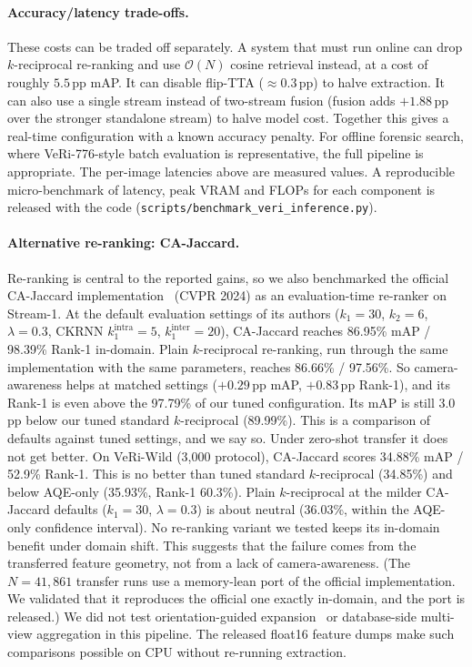 \paragraph{Accuracy/latency trade-offs.} These costs can be traded off separately. A system that must run online can drop $k$-reciprocal re-ranking and use $\mathcal{O}(N)$ cosine retrieval instead, at a cost of roughly $5.5$\,pp mAP. It can disable flip-TTA ($\approx\!0.3$\,pp) to halve extraction. It can also use a single stream instead of two-stream fusion (fusion adds $+1.88$\,pp over the stronger standalone stream) to halve model cost. Together this gives a real-time configuration with a known accuracy penalty. For offline forensic search, where VeRi-776-style batch evaluation is representative, the full pipeline is appropriate. The per-image latencies above are measured values. A reproducible micro-benchmark of latency, peak VRAM and FLOPs for each component is released with the code (\texttt{scripts/benchmark\_veri\_inference.py}).

\paragraph{Alternative re-ranking: CA-Jaccard.} Re-ranking is central to the reported gains, so we also benchmarked the official CA-Jaccard implementation~\cite{chen2024cajaccard} (CVPR 2024) as an evaluation-time re-ranker on Stream-1. At the default evaluation settings of its authors ($k_1{=}30$, $k_2{=}6$, $\lambda{=}0.3$, CKRNN $k_1^{\mathrm{intra}}{=}5$, $k_1^{\mathrm{inter}}{=}20$), CA-Jaccard reaches 86.95\% mAP / 98.39\% Rank-1 in-domain. Plain $k$-reciprocal re-ranking, run through the same implementation with the same parameters, reaches 86.66\% / 97.56\%. So camera-awareness helps at matched settings ($+0.29$\,pp mAP, $+0.83$\,pp Rank-1), and its Rank-1 is even above the 97.79\% of our tuned configuration. Its mAP is still 3.0\,pp below our tuned standard $k$-reciprocal (89.99\%). This is a comparison of defaults against tuned settings, and we say so. Under zero-shot transfer it does not get better. On VeRi-Wild (3{,}000 protocol), CA-Jaccard scores 34.88\% mAP / 52.9\% Rank-1. This is no better than tuned standard $k$-reciprocal (34.85\%) and below AQE-only (35.93\%, Rank-1 60.3\%). Plain $k$-reciprocal at the milder CA-Jaccard defaults ($k_1{=}30$, $\lambda{=}0.3$) is about neutral (36.03\%, within the AQE-only confidence interval). No re-ranking variant we tested keeps its in-domain benefit under domain shift. This suggests that the failure comes from the transferred feature geometry, not from a lack of camera-awareness. (The $N{=}41{,}861$ transfer runs use a memory-lean port of the official implementation. We validated that it reproduces the official one exactly in-domain, and the port is released.) We did not test orientation-guided expansion~\cite{zhang2022vehiclererank} or database-side multi-view aggregation in this pipeline. The released float16 feature dumps make such comparisons possible on CPU without re-running extraction.
